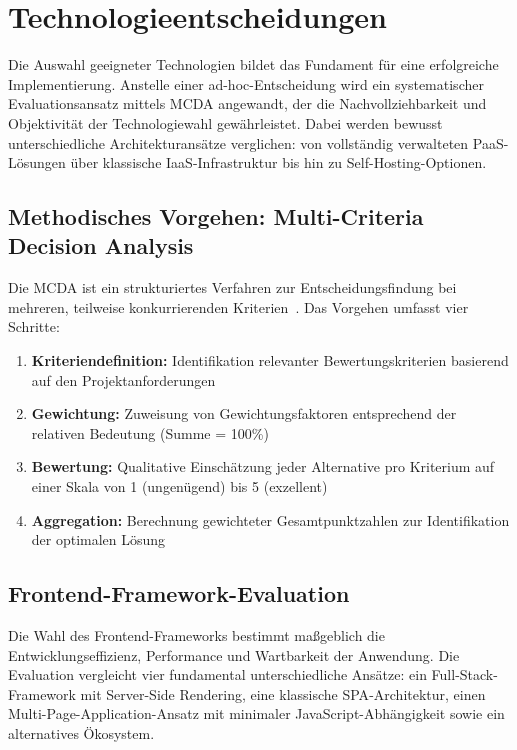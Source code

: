 \section{Technologieentscheidungen}
\label{sec:technologieentscheidungen}

Die Auswahl geeigneter Technologien bildet das Fundament für eine erfolgreiche Implementierung. Anstelle einer ad-hoc-Entscheidung wird ein systematischer Evaluationsansatz mittels \ac{MCDA} angewandt, der die Nachvollziehbarkeit und Objektivität der Technologiewahl gewährleistet. Dabei werden bewusst unterschiedliche Architekturansätze verglichen: von vollständig verwalteten \ac{PaaS}-Lösungen über klassische \ac{IaaS}-Infrastruktur bis hin zu Self-Hosting-Optionen.

\subsection{Methodisches Vorgehen: Multi-Criteria Decision Analysis}
\label{sec:mcda-methodik}

Die \ac{MCDA} ist ein strukturiertes Verfahren zur Entscheidungsfindung bei mehreren, teilweise konkurrierenden Kriterien~\cite{belton2002multiple}. Das Vorgehen umfasst vier Schritte:

\begin{enumerate}
    \item \textbf{Kriteriendefinition:} Identifikation relevanter Bewertungskriterien basierend auf den Projektanforderungen
    \item \textbf{Gewichtung:} Zuweisung von Gewichtungsfaktoren entsprechend der relativen Bedeutung (Summe = 100\%)
    \item \textbf{Bewertung:} Qualitative Einschätzung jeder Alternative pro Kriterium auf einer Skala von 1 (ungenügend) bis 5 (exzellent)
    \item \textbf{Aggregation:} Berechnung gewichteter Gesamtpunktzahlen zur Identifikation der optimalen Lösung
\end{enumerate}

\subsection{Frontend-Framework-Evaluation}
\label{sec:frontend-evaluation}

Die Wahl des Frontend-Frameworks bestimmt maßgeblich die Entwicklungseffizienz, Performance und Wartbarkeit der Anwendung. Die Evaluation vergleicht vier fundamental unterschiedliche Ansätze: ein Full-Stack-Framework mit Server-Side Rendering, eine klassische \ac{SPA}-Architektur, einen Multi-Page-Application-Ansatz mit minimaler JavaScript-Abhängigkeit sowie ein alternatives Ökosystem.

